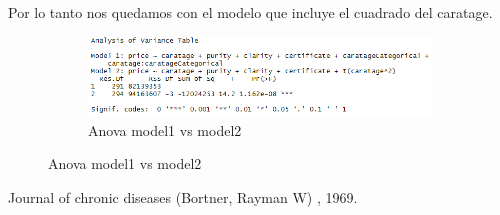 \documentclass[a4paper, 9pt]{article}
\begin{document}
Por lo tanto nos quedamos con el modelo que incluye el cuadrado del caratage.

\begin{figure}[h!]
  \centering
  \begin{subfigure}[b]{0.8\linewidth}
    \includegraphics[width=\linewidth]{report/images/question-4/anova-exercise4.png}
    \caption{Anova model1 vs model2}
  \end{subfigure}
  \label{fig:coffee}
\end{figure}

\begin{thebibliography}{9}
    Journal of chronic diseases (Bortner, Rayman W)
    , 1969.

\end{thebibliography}
\end{document}
